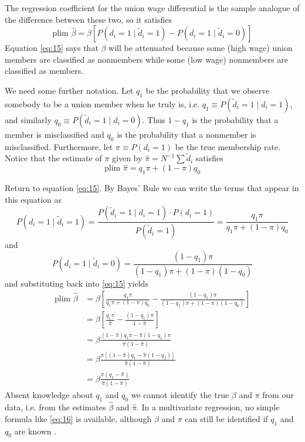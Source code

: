 \documentclass[12pt]{article}
\begin{document}
The regression coefficient for the union wage differential is the sample analogue of the difference between these two, so it satisfies
\[
\text{plim } \hat{\beta} = \beta\left[P(d_i = 1 \mid \tilde{d}_i = 1) - P(d_i = 1 \mid \tilde{d}_i = 0)\right]
\]
Equation \eqref{eq:15} says that $\beta$ will be attenuated because some (high wage) union members are classified as nonmembers while some (low wage) nonmembers are classified as members.

We need some further notation. Let $q_1$ be the probability that we observe somebody to be a union member when he truly is, i.e. $q_1 \equiv P(\tilde{d}_i = 1 \mid d_i = 1)$, and similarly $q_0 \equiv P(\tilde{d}_i = 1 \mid d_i = 0)$. Thus $1 - q_1$ is the probability that a member is misclassified and $q_0$ is the probability that a nonmember is misclassified. Furthermore, let $\pi \equiv P(d_i = 1)$ be the true membership rate. Notice that the estimate of $\pi$ given by $\hat{\pi} = N^{-1}\sum \tilde{d}_i$ satisfies
\[
\text{plim } \hat{\pi} = q_1\pi + (1 - \pi)q_0
\]

Return to equation \eqref{eq:15}. By Bayes' Rule we can write the terms that appear in this equation as
\[
P(d_i = 1 \mid \tilde{d}_i = 1) = \frac{P(\tilde{d}_i = 1 \mid d_i = 1) \cdot P(d_i = 1)}{P(\tilde{d}_i = 1)} = \frac{q_1\pi}{q_1\pi + (1 - \pi)q_0}
\]
and
\[
P(d_i = 1 \mid \tilde{d}_i = 0) = \frac{(1 - q_1)\pi}{(1 - q_1)\pi + (1 - \pi)(1 - q_0)}
\]
and substituting back into \eqref{eq:15} yields
\begin{align}
\label{eq:16}
\text{plim } \hat{\beta} &= \beta\left[\frac{q_1\pi}{q_1\pi + (1 - \pi)q_0} - \frac{(1 - q_1)\pi}{(1 - q_1)\pi + (1 - \pi)(1 - q_0)}\right]\nonumber\\
&= \beta\left[\frac{q_1\pi}{\hat{\pi}} - \frac{(1 - q_1)\pi}{1 - \hat{\pi}}\right]\nonumber\\
&= \beta \frac{(1 - \hat{\pi})q_1\pi - \hat{\pi}(1 - q_1)\pi}{\hat{\pi}(1 - \hat{\pi})}\\
&= \beta \frac{\pi[(1 - \hat{\pi})q_1 - \hat{\pi}(1 - q_1)]}{\hat{\pi}(1 - \hat{\pi})}\nonumber\\
&= \beta \frac{\pi(q_1 - \hat{\pi})}{\hat{\pi}(1 - \hat{\pi})}\nonumber
\end{align}
Absent knowledge about $q_1$ and $q_0$ we cannot identify the true $\beta$ and $\pi$ from our data, i.e. from the estimates $\hat{\beta}$ and $\hat{\pi}$. In a multivariate regression, no simple formula like \eqref{eq:16} is available, although $\beta$ and $\pi$ can still be identified if $q_1$ and $q_0$ are known \cite{Aigner_1973}.
\end{document}

